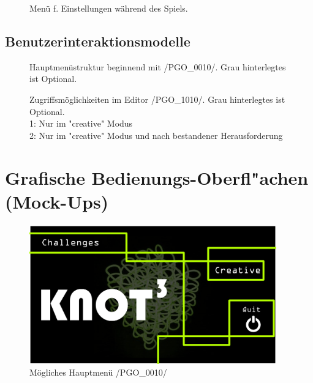 	\begin{figure}[!ht]
		  \centering
		  
		  \caption{Menü f. Einstellungen während des Spiels.}
	\end{figure}

	
\clearpage

\begin{landscape}

	\section{Benutzerinteraktionsmodelle}

	\begin{figure}[!h]
		\centering
	 	
	 	\caption{Hauptmenüstruktur beginnend mit /PGO\_0010/. Grau hinterlegtes ist Optional.}
	\end{figure}
	
\end{landscape}

\clearpage

\begin{landscape}

	\begin{figure}[h]
		\centering
	 	
	 	\caption{Zugriffsmöglichkeiten im Editor /PGO\_1010/. Grau hinterlegtes ist Optional.\\\hspace{\textwidth}
			1: Nur im "creative" Modus\\\hspace{\textwidth}
			2: Nur im "creative" Modus und nach bestandener Herausforderung}
		\label{fig:ingamemenu}
	\end{figure}
	
\end{landscape}
	
\clearpage



%
%
%
\section{Grafische Bedienungs-Oberfl{"a}chen (Mock-Ups)}
	
	\begin{figure}[ht]
	  \centering
	  \includegraphics[width = 0.95\textwidth]{Inhalt/Nutzung/Grafiken/Grafische_Oberflaechen/01_Knot3-mainscreen.png}
	  \caption{Mögliches Hauptmenü /PGO\_0010/}
	  \label{fig:mainscreen}
	\end{figure}

